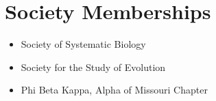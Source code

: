 \documentclass[12pt]{article}
\begin{document}
\section{Society Memberships}
\begin{itemize}
    \item Society of Systematic Biology
    \item Society for the Study of Evolution
    \item Phi Beta Kappa, Alpha of Missouri Chapter 
\end{itemize}


\end{document}
